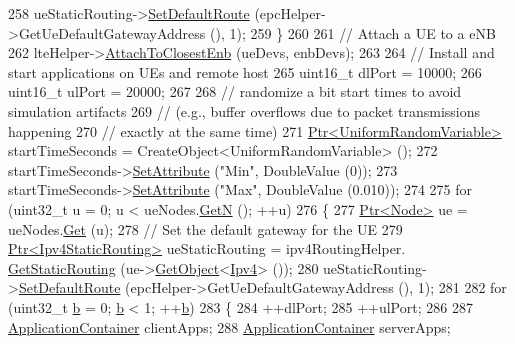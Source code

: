 \begin{DoxyCode}
258       ueStaticRouting->\hyperlink{classns3_1_1Ipv4StaticRouting_aee30fa3246c2b42f122dabdff2725331}{SetDefaultRoute} (epcHelper->GetUeDefaultGatewayAddress (), 1);
259     \}
260 
261   \textcolor{comment}{// Attach a UE to a eNB}
262   lteHelper->\hyperlink{classns3_1_1LteHelper_af1e68c53f22b705f1c41753558240999}{AttachToClosestEnb} (ueDevs, enbDevs);
263 
264   \textcolor{comment}{// Install and start applications on UEs and remote host}
265   uint16\_t dlPort = 10000;
266   uint16\_t ulPort = 20000;
267 
268   \textcolor{comment}{// randomize a bit start times to avoid simulation artifacts}
269   \textcolor{comment}{// (e.g., buffer overflows due to packet transmissions happening}
270   \textcolor{comment}{// exactly at the same time)}
271   \hyperlink{classns3_1_1Ptr}{Ptr<UniformRandomVariable>} startTimeSeconds = 
      CreateObject<UniformRandomVariable> ();
272   startTimeSeconds->\hyperlink{classns3_1_1ObjectBase_ac60245d3ea4123bbc9b1d391f1f6592f}{SetAttribute} (\textcolor{stringliteral}{"Min"}, DoubleValue (0));
273   startTimeSeconds->\hyperlink{classns3_1_1ObjectBase_ac60245d3ea4123bbc9b1d391f1f6592f}{SetAttribute} (\textcolor{stringliteral}{"Max"}, DoubleValue (0.010));
274 
275   \textcolor{keywordflow}{for} (uint32\_t u = 0; u < ueNodes.\hyperlink{classns3_1_1NodeContainer_aed647ac56d0407a7706aba02eb44b951}{GetN} (); ++u)
276     \{
277       \hyperlink{classns3_1_1Ptr}{Ptr<Node>} ue = ueNodes.\hyperlink{classns3_1_1NodeContainer_a9ed96e2ecc22e0f5a3d4842eb9bf90bf}{Get} (u);
278       \textcolor{comment}{// Set the default gateway for the UE}
279       \hyperlink{classns3_1_1Ptr}{Ptr<Ipv4StaticRouting>} ueStaticRouting = ipv4RoutingHelper.
      \hyperlink{classns3_1_1Ipv4StaticRoutingHelper_a731206e50d305695dac7fb2ef963a4bb}{GetStaticRouting} (ue->\hyperlink{classns3_1_1Object_a13e18c00017096c8381eb651d5bd0783}{GetObject}<\hyperlink{classns3_1_1Ipv4}{Ipv4}> ());
280       ueStaticRouting->\hyperlink{classns3_1_1Ipv4StaticRouting_aee30fa3246c2b42f122dabdff2725331}{SetDefaultRoute} (epcHelper->GetUeDefaultGatewayAddress (), 1);
281 
282       \textcolor{keywordflow}{for} (uint32\_t \hyperlink{buildings__pathloss_8m_a21ad0bd836b90d08f4cf640b4c298e7c}{b} = 0; \hyperlink{buildings__pathloss_8m_a21ad0bd836b90d08f4cf640b4c298e7c}{b} < 1; ++\hyperlink{buildings__pathloss_8m_a21ad0bd836b90d08f4cf640b4c298e7c}{b})
283         \{
284           ++dlPort;
285           ++ulPort;
286 
287           \hyperlink{classns3_1_1ApplicationContainer}{ApplicationContainer} clientApps;
288           \hyperlink{classns3_1_1ApplicationContainer}{ApplicationContainer} serverApps;

\end{DoxyCode}
